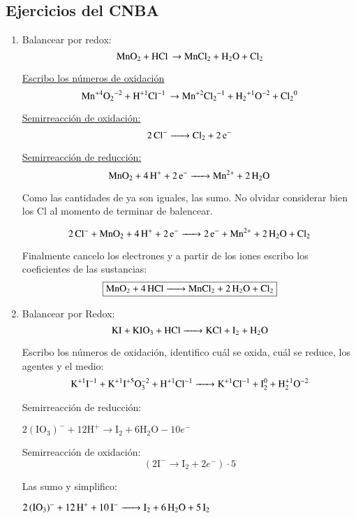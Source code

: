 \subsection{Ejercicios del CNBA}

\begin{enumerate}
\item Balancear por redox:
$$\ce{MnO_2 + HCl \rightarrow MnCl_2 + H_2O + Cl_2}$$

\underline{Escribo los números de oxidación}
$$\ce{Mn^{+4}O_2^{-2} + H^{+1}Cl^{-1} \rightarrow Mn^{+2}Cl_2^{-1} + H_2^{+1}O^{-2} + Cl_2^{0}}$$

\begin{multicols}{2}
    \underline{Semirreacción de oxidación:}
    $$\ce{2Cl^- ->
    Cl_2 + 2e^-}$$
    
    \underline{Semirreacción de reducción:}
    $$\ce{MnO_2 + 4 H^+ + 2e^- ->
    Mn^{2+} + 2H_2O}$$
\end{multicols}

Como las cantidades de  ya son iguales, las sumo. No olvidar considerar bien los Cl al momento de terminar de balencear.

$$\ce{2 Cl^- + MnO_2 + 4H^+ + 2e^- -> 2e^- + Mn^{2+} + 2H_2O + Cl_2}$$

Finalmente cancelo los electrones y a partir de los iones escribo los coeficientes de las sustancias:
$$\fbox{\ce{MnO_2 + 4HCl -> MnCl_2 + 2H_2O + Cl_2}}$$


\item Balancear por Redox:
$$\ce{
KI + KIO3 + HCl ->
KCl + I2 + H2O
}$$

Escribo los números de oxidación, identifico cuál se oxida, cuál se reduce, los agentes y el medio: 
$$\ce{
K^{+1}I^{-1} + K^{+1}I^{+5}O^{-2}3 + H^{+1}Cl^{-1} ->
K^{+1}Cl^{-1} + I^{0}2 + H^{+1}2O^{-2}
}$$


\begin{multicols}{2}
Semirreacción de reducción:

\hfil$2(\text{IO}_3)^{-} + 12 \text{H}^+ \longrightarrow \text{I}_2 + 6\text{H}_2 \text{O} - 10e^-$\hfil

Semirreacción de oxidación:
$$\left(2\text{I}^{-} \longrightarrow \text{I}_2 + 2e^-\right)\cdot 5$$
\end{multicols}

Las sumo y simplifico:

\hfil$\ce{2(IO3)^- + 12H^+ + 10 I^- -> I2 + 6H2O + 5I2}$\hfil


\end{enumerate}
